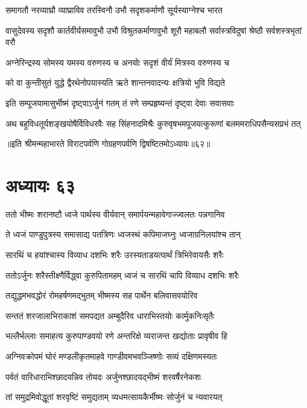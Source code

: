 \twolineshloka
{समागतौ नरव्याघ्रौ व्याघ्राविव तरस्विनौ}
{उभौ सदृशकर्माणौ सूर्यस्याग्नेश्च भारत}


\threelineshloka
{वासुदेवस्य सदृशौ कार्तवीर्यसमावुभौ}
{उभौ विश्रुतकर्माणावुभौ शूरौ महाबलौ}
{सर्वास्त्रविदुषां श्रेष्ठौ सर्वशस्त्रभृतां वरौ}


\twolineshloka
{अग्नेरिन्द्रस्य सोमस्य यमस्य वरुणस्य च}
{अनयोः सदृशं वीर्यं मित्रस्य वरुणस्य च}


\twolineshloka
{को वा कुन्तीसुतं युद्धे द्वैरथेनोपयास्यति}
{ऋते शान्तनवादन्यः क्षत्रियो भुवि विद्यते}


\twolineshloka
{इति सम्पूजयामासुर्भीष्मं दृष्ट्वाऽर्जुनं गतम्}
{तं रणे सम्प्रहृष्यन्तं दृष्ट्वा देवाः सवासवाः}


\twolineshloka
{अथ बहुविधतूर्यशङ्खयोषैर्विविधरवैः सह सिंहनादमिश्रैः}
{कुरुवृषभमपूजयत्कुरूणां बलममराधिपसैन्यसप्रभं तत्}

॥इति श्रीमन्महाभारते विराटपर्वणि गोग्रहणपर्वणि द्विषष्टितमोऽध्यायः॥६२॥

\chapter{अध्यायः ६३}

\twolineshloka
{ततो भीष्मः शरानष्टौ ध्वजे पार्थस्य वीर्यवान्}
{समार्पयन्महावेगाज्ज्वलतः पन्नगानिव}


\twolineshloka
{ते ध्वजं पाण्डुपुत्रस्य समासाद्य पतत्रिणः}
{ध्वजस्थं कपिमाजघ्नुः ध्वजाग्रनिलयांश्च तान्}


\twolineshloka
{सारथिं च हयांश्चास्य विव्याध दशभिः शरैः}
{उरस्यताडयत्पार्थं त्रिभिरेवायसैः शरैः}


\twolineshloka
{ततोऽर्जुनः शरैस्तीक्ष्णैर्विद्ध्वा कुरुपितामहम्}
{ध्वजं च सारथिं चापि विव्याध दशभिः शरैः}


\twolineshloka
{तद्युद्धमभवद्धोरं रोमहर्षणमद्भुतम्}
{भीष्मस्य सह पार्थेन बलिवासवयोरिव}


\twolineshloka
{सन्ततं शरजालाभिराकाशं समपद्यत}
{अम्बुदैरिव धाराभिस्तयोः कार्मुकनिःसृतैः}


\twolineshloka
{भल्लैर्भल्लाः समाहत्य कुरुपाण्डवयो रणे}
{अन्तरिक्षे व्यराजन्त खद्योताः प्रावृषीव हि}


\twolineshloka
{अग्निवक्रोपमं घोरं मण्डलीकृतमाहवे}
{गाण्डीवमभवञ्जिष्णोः सव्यं दक्षिणमस्यतः}


\twolineshloka
{पर्वतं वारिधाराभिश्छादयन्निव तोयदः}
{अर्जुनश्छादयद्भीष्मं शरवर्षैरनेकशः}


\twolineshloka
{तां समुद्रमिवोद्धूतां शरवृष्टिं समुद्यताम्}
{व्यधमत्सायकैर्भीष्मः सोर्जुनं च न्यवारयत्}


